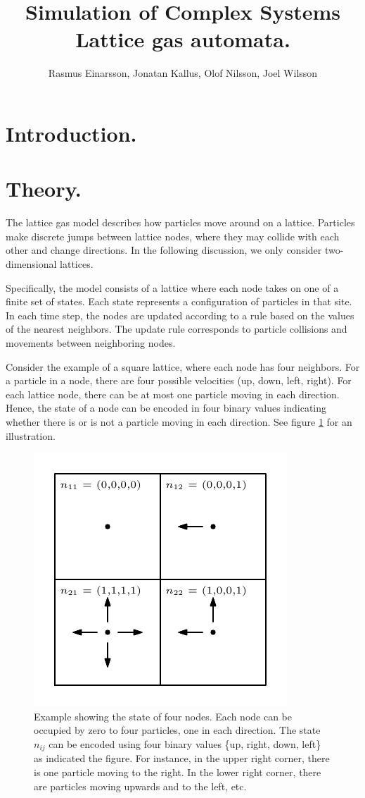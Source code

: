 \documentclass[12pt,a4paper]{article}
\author{Rasmus Einarsson, Jonatan Kallus, Olof Nilsson, Joel Wilsson}
\title{Simulation of Complex Systems\\Lattice gas automata.}
\begin{document}
\maketitle

\section{Introduction.}

\section{Theory.}
The lattice gas model describes how particles move around on a lattice. Particles make discrete jumps between lattice nodes, where they may collide with each other and change directions. In the following discussion, we only consider two-dimensional lattices.

Specifically, the model consists of a lattice where each node takes on one of a finite set of states. Each state represents a configuration of particles in that site. In each time step, the nodes are updated according to a rule based on the values of the nearest neighbors. The update rule corresponds to particle collisions and movements between neighboring nodes.

Consider the example of a square lattice, where each node has four neighbors. For a particle in a node, there are four possible velocities (up, down, left, right). For each lattice node, there can be at most one particle moving in each direction. Hence, the state of a node can be encoded in four binary values indicating whether there is or is not a particle moving in each direction. See figure \ref{fig:square-state} for an illustration.

\begin{figure}[htp]
\centering
  \includegraphics{figs/square-state.pdf}
\caption{Example showing the state of four nodes. Each node can be occupied by zero to four particles, one in each direction. The state $n_{ij}$ can be encoded using four binary values \{up, right, down, left\} as indicated the figure. For instance, in the upper right corner, there is one particle moving to the right. In the lower right corner, there are particles moving upwards and to the left, etc.}
\label{fig:square-state}
\end{figure}
\end{document}
